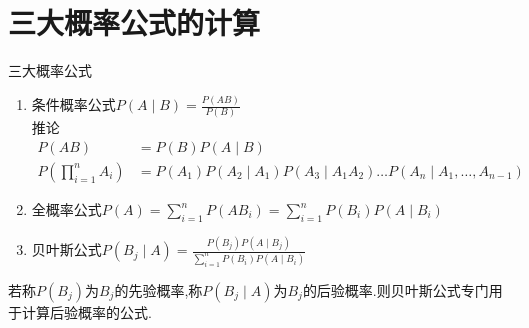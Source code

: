 \documentclass[12pt, a4paper, oneside, UTF8]{ctexbook}
\begin{document}
\section{三大概率公式的计算}
\begin{remark}
    三大概率公式
    \begin{enumerate}
    \item 条件概率公式\qquad $P(A\mid B)=\frac{P(AB)}{P(B)}$ \\
    推论 
    \begin{align*}
        P(AB) &= P(B)P(A\mid B) \\
        P(\prod_{i=1}^{n}A_i) &= P(A_1)P(A_2\mid A_1)P(A_3\mid A_1A_2) \ldots P(A_n\mid A_1,\ldots,A_{n-1})
    \end{align*}
    \item 全概率公式\qquad $P(A)=\sum_{i=1}^{n}P(AB_i)=\sum_{i=1}^{n}P(B_i)P(A\mid B_i)$
    \item 贝叶斯公式\qquad $P(B_j\mid A)=\frac{P(B_j)P(A\mid B_j)}{\displaystyle \sum_{i=1}^{n}P(B_i)P(A\mid B_i)}$
    \end{enumerate}
    若称$P(B_j)$为$B_j$的先验概率,称$P(B_j\mid A)$为$B_j$的后验概率.则贝叶斯公式专门用于计算后验概率的公式.
\end{remark}
\end{document}
